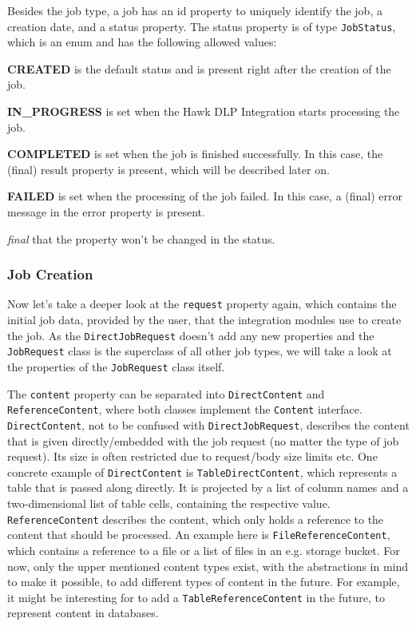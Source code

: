 Besides the job type, a job has an id property to uniquely identify the job, a creation date, and a status property. The status property is of type \texttt{JobStatus}, which is an enum and has the following allowed values: 

\textbf{CREATED} is the default status and is present right after the creation of the job.

\textbf{IN\_PROGRESS} is set when the Hawk DLP Integration starts processing the job.

\textbf{COMPLETED} is set when the job is finished successfully. In this case, the (final) result property is present, which will be described later on.

\textbf{FAILED} is set when the processing of the job failed. In this case, a (final) error message in the error property is present.

\textit{final} that the property won't be changed in the status.

\subsubsection{Job Creation}

Now let's take a deeper look at the \texttt{request} property again, which contains the initial job data, provided by the user, that the integration modules use to create the job.
As the \texttt{DirectJobRequest} doesn't add any new properties and the \texttt{JobRequest} class is the superclass of all other job types, we will take a look at the properties of the \texttt{JobRequest} class itself.

The \texttt{content} property can be separated into \texttt{DirectContent} and \texttt{ReferenceContent}, where both classes implement the \texttt{Content} interface. \texttt{DirectContent}, not to be confused with \texttt{DirectJobRequest}, describes the content that is given directly/embedded with the job request (no matter the type of job request). Its size is often restricted due to request/body size limits etc. One concrete example of \texttt{DirectContent} is \texttt{TableDirectContent}, which represents a table that is passed along directly. It is projected by a list of column names and a two-dimensional list of table cells, containing the respective value. \texttt{ReferenceContent} describes the content, which only holds a reference to the content that should be processed. An example here is \texttt{FileReferenceContent}, which contains a reference to a file or a list of files in an e.g. storage bucket.
For now, only the upper mentioned content types exist, with the abstractions in mind to make it possible, to add different types of content in the future. For example, it might be interesting for to add a \texttt{TableReferenceContent} in the future, to represent content in databases.

